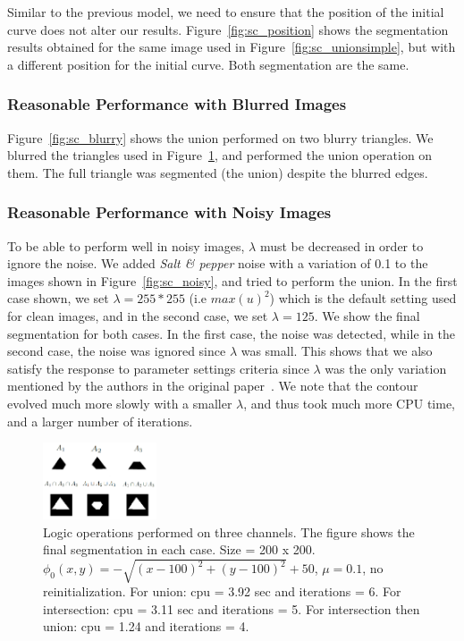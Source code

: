 \documentclass[10pt,twocolumn,letterpaper]{article}
\begin{document}
Similar to the previous model, we need to ensure that the position of the initial curve does not alter our results. Figure~\ref{fig:sc_position} shows
the segmentation results obtained for the same image used in Figure~\ref{fig:sc_unionsimple}, but with a different position for the initial curve. Both
segmentation are the same.


\subsubsection*{Reasonable Performance with Blurred Images}

Figure~\ref{fig:sc_blurry} shows the union performed on two blurry triangles. We blurred the triangles used in Figure~\ref{fig:threech}, and performed the
union operation on them. The full triangle was segmented (the union) despite the blurred edges.


\subsubsection*{Reasonable Performance with Noisy Images}

To be able to perform well in noisy images, $\lambda$ must be decreased in order to ignore the noise. We added \textit{Salt \& pepper} noise with a variation of
0.1 to
the images shown in Figure~\ref{fig:sc_noisy}, and tried to perform the union. In the first case shown, we set $\lambda = 255*255$ (i.e $ max(u)^2$) which is
the default setting
used for clean images, and in the second case, we set $\lambda = 125$. We show the final segmentation for both cases. In the first case, the noise was detected,
while in the second case, the noise was ignored since $\lambda$ was small. This shows that we also satisfy the response to parameter settings criteria since
$\lambda$ was the only variation mentioned by the authors in the original paper~\cite{sandberg2005logic}. We note that the contour evolved much more slowly
with a smaller $\lambda$, and thus took much more CPU time, and a larger number of iterations.

\begin{figure}[t!]
\centering
\includegraphics[width=0.3\textwidth]{threech.png}
\caption{Logic operations performed on three channels. The figure shows the final segmentation in each case. Size = 200 x 200. $\phi_{0}(x,y) = - \sqrt{(x -
100)^2 + (y - 100)^2} + 50$, $\mu = 0.1$, no reinitialization. For union: cpu = 3.92 sec and iterations = 6. For intersection: cpu = 3.11 sec and iterations =
5. For intersection then union: cpu = 1.24 and iterations = 4.}
\label{fig:threech}
\end{figure}
\end{document}
